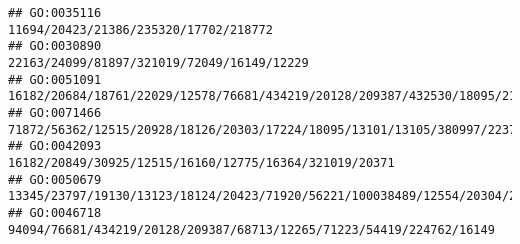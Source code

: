 \documentclass[
]{article}
\begin{document}
\begin{verbatim}
## GO:0035116                                                                                                                                                                                                                                                                                                                                                                        11694/20423/21386/235320/17702/218772
## GO:0030890                                                                                                                                                                                                                                                                                                                                                                   22163/24099/81897/321019/72049/16149/12229
## GO:0051091                                                                                                                                                                                                                                                                                                          16182/20684/18761/22029/12578/76681/434219/20128/209387/432530/18095/21943/15511/224762/77596/17986
## GO:0071466                                                                                                                                                                                                                                                                                                           71872/56362/12515/20928/18126/20303/17224/18095/13101/13105/380997/223706/13078/72082/433247/12780
## GO:0042093                                                                                                                                                                                                                                                                                                                                                       16182/20849/30925/12515/16160/12775/16364/321019/20371
## GO:0050679                                                                                                                                                                                                                                                                                                    13345/23797/19130/13123/18124/20423/71920/56221/100038489/12554/20304/20666/14165/18092/15117/21380/12229
## GO:0046718                                                                                                                                                                                                                                                                                                                                         94094/76681/434219/20128/209387/68713/12265/71223/54419/224762/16149

\end{verbatim}
\end{document}
